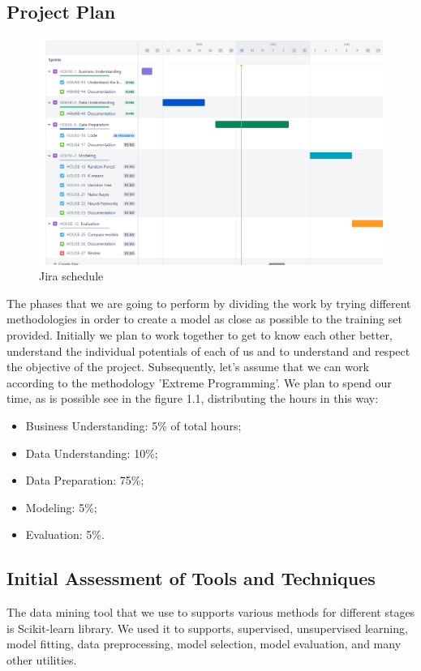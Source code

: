 \subsection{Project Plan}

\begin{figure}[t]
    \includegraphics[scale=0.45]{imgs/jira_schedule.png}
    \centering
    \caption{Jira schedule}
    \hrulefill\vspace{15pt}\par
\end{figure}

The phases that we are going to perform by dividing the work by trying different methodologies in order to create a model as close as possible to the training set provided. Initially we plan to work together to get to know each other better, understand the individual potentials of each of us and to understand and respect the objective of the project. Subsequently, let's assume that we can work according to the methodology 'Extreme Programming'.
We plan to spend our time, as is possible see in the figure 1.1, distributing the hours in this way:
\begin{itemize}
\item Business Understanding: 5\% of total hours;
\item Data Understanding: 10\%;
\item Data Preparation: 75\%; 
\item Modeling: 5\%;
\item Evaluation: 5\%.
\end{itemize}

\subsection{Initial Assessment of Tools and
Techniques}
The data mining tool that we use to supports various methods for different stages is Scikit-learn library. We used it to supports, supervised, unsupervised learning, model fitting, data preprocessing, model selection, model evaluation, and many other utilities.